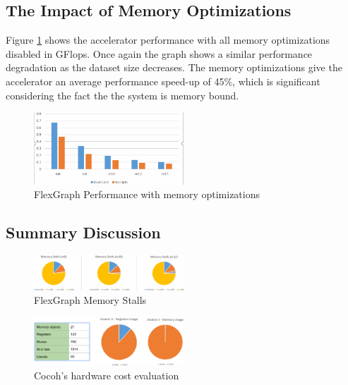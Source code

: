 \subsection{The Impact of Memory Optimizations}

Figure \ref{fig:no_opts_perf} shows the accelerator performance with all memory optimizations disabled in GFlops. Once again the graph shows a similar performance degradation as the dataset size decreases. The memory optimizations give the accelerator an average performance speed-up of 45\%, which is significant considering the fact the the system is memory bound.

\begin{figure}[htbp]
\centering
\includegraphics[width=0.5\textwidth]{figures/no_opts_perf}
\caption{FlexGraph Performance with memory optimizations}
\label{fig:no_opts_perf}
\end{figure}

\subsection{Summary Discussion}    

\begin{figure}[htbp]
\centering
\includegraphics[width=0.5\textwidth]{figures/memory_stalls}
\caption{FlexGraph Memory Stalls}
\label{fig:memory_stalls}
\end{figure}

\begin{figure}[htbp]
\centering
\includegraphics[width=0.5\textwidth]{figures/hardware_cost}
\caption{Cocoh's hardware cost evaluation}
\label{fig:hardware_cost}
\end{figure}

